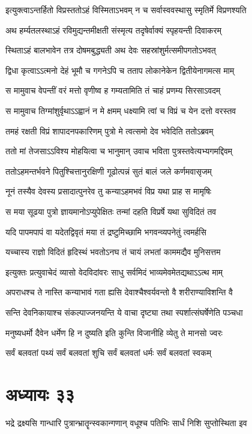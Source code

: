 \twolineshloka
{इत्युक्त्वाऽन्तर्हितो विप्रस्ततोऽहं विस्मिताऽभवम्}
{न च सर्वास्ववस्थासु स्मृतिर्मे विप्रणश्यति}


\twolineshloka
{अथ हर्म्यतलस्थाऽहं रविमुद्यन्तमीक्षती}
{संस्मृत्य तदृषेर्वाक्यं स्पृहयन्ती दिवाकरम्}


\twolineshloka
{स्थिताऽहं बालभावेन तत्र दोषमबुद्ध्यती}
{अथ देवः सहस्रांशुर्मत्समीपगतोऽभवत्}


\twolineshloka
{द्विधा कृत्वाऽऽत्मनो देहं भूमौ च गगनेऽपि च}
{तताप लोकानेकेन द्वितीयेनागमत्स माम्}


\twolineshloka
{स मामुवाच वेपन्तीं वरं मत्तो वृणीष्व ह}
{गम्यतामिति तं चाहं प्रणम्य सिरसाऽवदम्}


\twolineshloka
{स मामुवाच तिग्मांशुर्वृथाऽऽह्वानं न मे क्षमम्}
{धक्ष्यामि त्वां च विप्रं च येन दत्तो वरस्तव}


\twolineshloka
{तमहं रक्षती विप्रं शापादनपकारिणम्}
{पुत्रो मे त्वत्समो देव भवेदिति ततोऽब्रवम्}


\twolineshloka
{ततो मां तेजसाऽऽविश्य मोहयित्वा च भानुमान्}
{उवाच भविता पुत्रस्तवेत्यभ्यगमद्दिवम्}


\twolineshloka
{ततोऽहमन्तर्भवने पितुश्चित्तानुरक्षिणी}
{गूढोत्पन्नं सुतं बालं जले कर्णमवासृजम्}


\twolineshloka
{नूनं तस्यैव देवस्य प्रसादात्पुनरेव तु}
{कन्याऽहमभवं विप्र यथा प्राह स मामृषिः}


\twolineshloka
{स मया सूढया पुत्रो ज्ञायमानोऽप्युपेक्षितः}
{तन्मां दहति विप्रर्षे यथा सुविदितं तव}


\twolineshloka
{यदि पापमपापं वा यदेतद्विवृतं मया}
{तं द्रष्टुमिच्छामि भगवन्व्यपनेतुं त्वमर्हसि}


\twolineshloka
{यच्चास्य राज्ञो विदितं हृदिस्थं भवतोऽनघ}
{तं चायं लभतां काममद्यैव मुनिसत्तम}


\twolineshloka
{इत्युक्तः प्रत्युवाचेदं व्यासो वेदविदांवरः}
{साधु सर्वमिदं भाव्यमेवमेतद्यथाऽऽत्थ माम्}


\twolineshloka
{अपराधश्च ते नास्ति कन्याभावं गता ह्यसि}
{देवाश्चैश्वर्यवन्तो वै शरीराण्याविशन्ति वै}


\twolineshloka
{सन्ति देवनिकायाश्च संकल्पाज्जनयन्ति ये}
{वाचा दृष्ट्या तथा स्पर्शात्संघर्षेणेति पञ्चधा}


\twolineshloka
{मनुष्यधर्मो दैवेन धर्मेण हि न दुष्यति}
{इति कुन्ति विजानीहि व्येतु ते मानसो ज्वरः}


\twolineshloka
{सर्वं बलवतां पथ्यं सर्वं बलवतां शुचि}
{सर्वं बलवतां धर्मः सर्वं बलवतां स्वकम्}


\chapter{अध्यायः ३३}
\twolineshloka
{भद्रे द्रक्ष्यसि गान्धारि पुत्रान्भ्रातॄन्स्वकान्गणान्}
{वधूश्च पतिभिः सार्धं निशि सुप्तोस्थिता इव}


